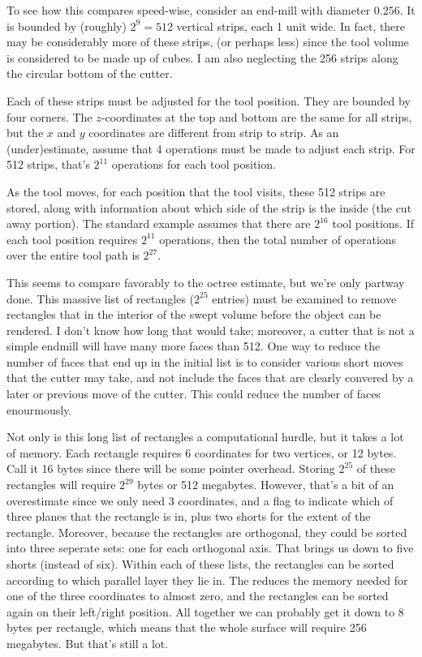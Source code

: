 \documentclass[titlepage,oneside,10pt]{article}
\begin{document}
To see how this compares speed-wise, consider an end-mill with
diameter $0.256$. It is bounded by (roughly) $2^9 = 512$ vertical strips, each
1 unit wide. In fact, there may be considerably more of these strips,
(or perhaps less) since the tool volume is considered to be made
up of cubes. I am also neglecting the 256 strips along the
circular bottom of the cutter.

Each of these strips must be adjusted for the tool position. They are
bounded by four corners. The $z$-coordinates at the top and bottom are
the same for all strips, but the $x$ and $y$ coordinates are
different from strip to strip. As an (under)estimate, assume that 4
operations must be made to adjust each strip. For 512 strips, that's
$2^{11}$ operations for each tool position.

As the tool moves, for each position that the tool visits, these 512
strips are stored, along with information about which side of the
strip is the inside (the cut away portion). The standard example
assumes that there are $2^{16}$ tool positions. If each tool position
requires $2^{11}$ operations, then the total number of operations
over the entire tool path is $2^{27}$. 

This seems to compare favorably to the octree estimate, but we're only
partway done. This massive list of rectangles ($2^{25}$ entries) must
be examined to remove rectangles that in the interior of the swept
volume before the object can be rendered. I don't know how long that
would take; moreover, a cutter that is not a simple endmill will have
many more faces than 512. One way to reduce the number of faces that
end up in the initial list is to consider various short moves that the
cutter may take, and not include the faces that are clearly convered
by a later or previous move of the cutter. This could reduce the
number of faces enourmously.

Not only is this long list of rectangles a computational hurdle, but
it takes a lot of memory. Each rectangle requires 6 coordinates for
two vertices, or 12 bytes. Call it 16 bytes since there will be some
pointer overhead. Storing $2^{25}$ of these rectangles will require
$2^{29}$ bytes or 512 megabytes. However, that's a bit of an
overestimate since we only need 3 coordinates, and a flag to indicate
which of three planes that the rectangle is in, plus two shorts for
the extent of the rectangle. Moreover, because the rectangles are
orthogonal, they could be sorted into three seperate sets: one for
each orthogonal axis. That brings us down to five shorts (instead of
six). Within each of these lists, the rectangles can be sorted
according to which parallel layer they lie in. The reduces the memory
needed for one of the three coordinates to almost zero, and the
rectangles can be sorted again on their left/right position. All
together we can probably get it down to 8 bytes per rectangle, which
means that the whole surface will require 256 megabytes. But that's
still a lot.
\end{document}
